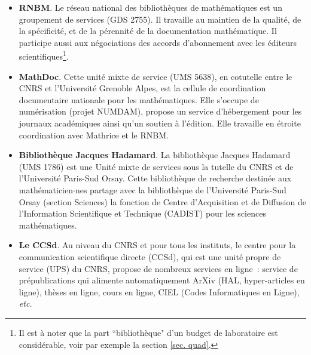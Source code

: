 \begin{itemize}
\item{\bf RNBM}. Le r\'eseau national des biblioth\`eques de
math\'ematiques est un groupement de services (GDS 2755). Il travaille au maintien de la qualit\'e, de
la sp\'ecificit\'e, et de la p\'erennit\'e de la documentation
math\'e\-ma\-ti\-que. Il participe aussi aux n\'egociations des accords
d'abonnement avec les \'editeurs scientifiques\footnote{Il est \`a noter que la part ``biblioth\`eque" d'un
budget de laboratoire est consid\'erable, voir par exemple la section \ref{sec. quad}.}.
\\
\item{\bf MathDoc}.
Cette unit\'e mixte de service (UMS 5638), en cotutelle entre le CNRS et l'Universit\'e Grenoble Alpes, est
la cellule de coordination documentaire nationale pour les
math\'ematiques. Elle s'occupe de num\'erisation (projet NUMDAM),
propose un service d'h\'ebergement pour les journaux acad\'emiques ainsi qu'un soutien \`a l'\'edition. Elle travaille  en \'etroite coordination avec Mathrice et le RNBM. \\
\item{\bf Biblioth\`eque Jacques Hadamard}.
La biblioth\`eque Jacques Hadamard (UMS 1786) est une Unit\'e mixte de services sous la tutelle du CNRS et de l'Universit\'e Paris-Sud Orsay.
Cette biblioth\`eque de recherche destin\'ee aux math\'ematicien$\cdot$nes partage avec la biblioth\`eque de l'Universit\'e Paris-Sud Orsay (section Sciences) la fonction de Centre d'Acquisition et de Diffusion de l'Information Scientifique et Technique (CADIST) pour les sciences math\'ematiques. 
\item{\bf Le CCSd}. Au niveau du CNRS et pour tous les instituts, 
le centre pour la communication scientifique directe (CCSd), qui est
une unit\'e propre de service (UPS) du CNRS, propose de nombreux
services en ligne~: service de pr\'epublications qui alimente
automatiquement ArXiv (HAL, hyper-articles en ligne), th\`eses en
ligne, cours en ligne, CIEL (Codes Informatiques en Ligne), {{\em etc.}}\\
\end{itemize}




